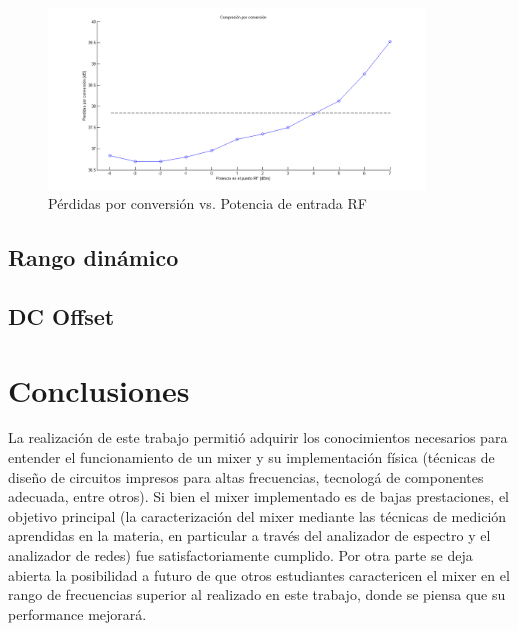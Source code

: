 \documentclass[a4paper,10pt]{article}
\begin{document}
	\begin{figure}[!htb]
		\centering
		\includegraphics[width=10cm]{Images/compresion.png}
		\caption{P\'erdidas por conversi\'on vs. Potencia de entrada RF}
		\label{compresion}
	\end{figure}	
	
	\subsection{Rango din\'amico}
	\subsection{DC Offset}
	\newpage
	\section{Conclusiones}
	La realizaci\'on de este trabajo permiti\'o adquirir los conocimientos necesarios para entender el funcionamiento de un mixer y su implementaci\'on f\'isica (t\'ecnicas de dise\~no de circuitos impresos para altas frecuencias, tecnolog\'a de componentes adecuada, entre otros). Si bien el mixer implementado es de bajas prestaciones, el objetivo principal (la caracterizaci\'on del mixer mediante las t\'ecnicas de medici\'on aprendidas en la materia, en particular a trav\'es del analizador de espectro y el analizador de redes) fue satisfactoriamente cumplido. 
	Por otra parte se deja abierta la posibilidad a futuro de que otros estudiantes caractericen el mixer en el rango de frecuencias superior al realizado en este trabajo, donde se piensa que su performance mejorar\'a. 
\end{document}
